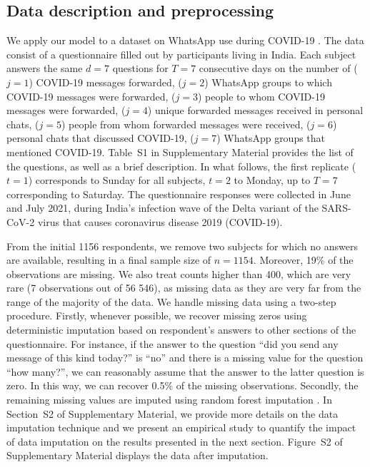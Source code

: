 \documentclass[11pt]{article}
\begin{document}
\subsection{Data description and preprocessing}

We apply our model to a dataset on WhatsApp use during COVID-19 \citep{clinicaltrials2021}. The data consist of a questionnaire filled out by participants living in India. Each subject answers the same $d=7$ questions for $T=7$ consecutive days on the number of 
($j=1$) COVID-19 messages forwarded,
($j=2$) WhatsApp groups to which COVID-19 messages were forwarded,
($j=3$) people to whom COVID-19 messages were forwarded,
($j=4$) unique forwarded messages received in personal chats,
($j=5$) people from whom forwarded messages were received,
($j=6$) personal chats that discussed COVID-19,
($j=7$) WhatsApp groups that mentioned COVID-19.
Table~S1 in Supplementary Material
provides the list of the questions, as well as a brief description. In what follows, the first replicate ($t=1$) corresponds to Sunday for all subjects, $t=2$ to Monday, up to $T=7$ corresponding to Saturday. The questionnaire responses were collected in June and July 2021, during India's infection wave of the Delta variant of the SARS-CoV-2 virus that causes coronavirus disease 2019 (COVID-19).

From the initial 1156 respondents, we remove two subjects for which no answers are available, resulting in a final sample size of $n=1154$. Moreover, 19\% of the observations are missing. We also treat counts higher than 400, which are very rare (7 observations out of 56 546), as missing data as they are very far from the range of the majority of the data. We handle missing data using a two-step procedure. Firstly, whenever possible, we recover missing zeros using deterministic imputation based on respondent's answers to other sections of the questionnaire. For instance, if the answer to the question ``did you send any message of this kind today?'' is ``no''  and there is a missing value for the question ``how many?'', we can reasonably assume that the answer to the latter question is zero. In this way, we can recover 0.5\% of the missing observations. Secondly, the remaining missing values are imputed using random forest imputation \citep[as implemented in the \texttt{R} package \texttt{mice},][]{mice}. In 
Section~S2 of Supplementary Material,
we provide more details on the data imputation technique and we present an empirical study to quantify the impact of data imputation on the results presented in the next section. Figure~S2 of Supplementary Material
displays the data after imputation. 
\end{document}

